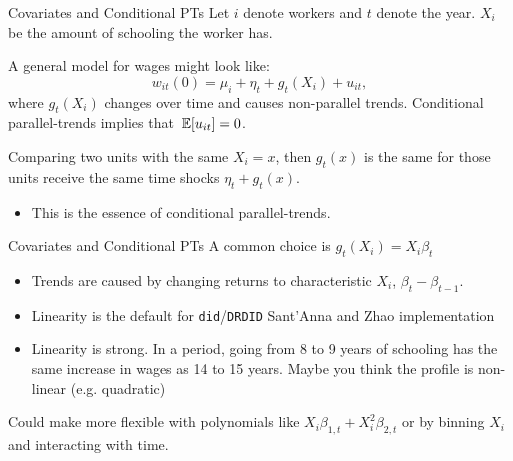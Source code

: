 \documentclass[t]{beamer}
\begin{document}
\begin{frame}{Covariates and Conditional PTs}
  Let $i$ denote workers and $t$ denote the year. $X_i$ be the amount of schooling the worker has.

  \bigskip
  A general model for wages might look like:
  $$
    w_{it}(0) = \mu_i + \eta_t + g_t(X_i)+ u_{it},
  $$
  where $g_t(X_i)$ changes over time and causes non-parallel trends. Conditional parallel-trends implies that $\expec{u_{it}} = 0$.

  \bigskip
  Comparing two units with the same $X_i = x$, then $g_t(x)$ is the same for those units receive the same time shocks $\eta_t + g_t(x)$.
  \begin{itemize}
    \item This is the essence of conditional parallel-trends.
  \end{itemize}
\end{frame}

\begin{frame}{Covariates and Conditional PTs}
  A common choice is $g_t(X_i) = X_i \beta_t$

  \begin{itemize}
    \item Trends are caused by changing returns to characteristic $X_i$, $\beta_{t} - \beta_{t-1}$.


    \item Linearity is the default for \texttt{did}/\texttt{DRDID} Sant'Anna and Zhao implementation

    \pause
    \item Linearity is strong. In a period, going from 8 to 9 years of schooling has the same increase in wages as 14 to 15 years. Maybe you think the profile is non-linear (e.g. quadratic)
  \end{itemize}

  \bigskip\pause
  Could make more flexible with polynomials like $X_i \beta_{1,t} + X_i^2 \beta_{2,t}$ or by binning $X_i$ and interacting with time.
\end{frame}
\end{document}
